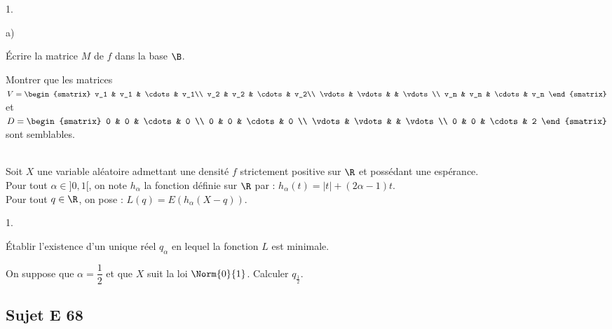 \documentclass[11pt]{article}%
\begin{document}
\begin{exerciceAP}
\begin{noliste}{1.}
  \item
    \begin{noliste}{a)}
    \setlength{\itemsep}{2mm}
    \item Écrire la matrice $M$ de $f$ dans la base $\B$.
    \item Montrer que les matrices $V =
      \begin{smatrix}
	v_1 & v_1 & \cdots & v_1\\
	v_2 & v_2 & \cdots & v_2\\
	\vdots & \vdots & & \vdots\\
	v_n & v_n & \cdots & v_n
      \end{smatrix}$ et $D = 
      \begin{smatrix}
        0 & 0 & \cdots & 0 \\
        0 & 0 & \cdots & 0 \\
        \vdots & \vdots & & \vdots\\
        0 & 0 & \cdots & 2
      \end{smatrix}$ sont semblables.
    \end{noliste}
  \end{noliste}
\end{exerciceAP}


\begin{exerciceSP}~\\
  Soit $X$ une variable aléatoire admettant une densité $f$
  strictement positive sur $\R$ et possédant une espérance.\\
  Pour tout $\alpha\in]0,1[$, on note $h_\alpha$ la fonction définie
  sur $\R$ par : $h_\alpha(t)=\vert t \vert + (2\alpha -1)t$.\\
  Pour tout $q\in\R$, on pose : $L(q)=E\left(h_\alpha(X-q)\right)$.
  \begin{noliste}{1.}
    \setlength{\itemsep}{2mm}
  \item Établir l'existence d'un unique réel $q_\alpha$ en lequel la
    fonction $L$ est minimale.
  \item On suppose que $\alpha=\dfrac{1}{2}$ et que $X$ suit la loi
    $\Norm{0}{1}$. Calculer $q_{\frac{1}{2}}$.
  \end{noliste}
\end{exerciceSP}


\newpage

\subsection*{Sujet E 68}
\end{document}
